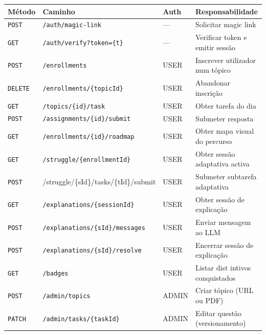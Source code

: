 \begin{table}[htbp]
	\centering
	\small
	\begin{tabular}{p{1.5cm} p{6.0cm} p{1.3cm} p{3.8cm}}
		\toprule
		\textbf{M\'etodo} & \textbf{Caminho} & \textbf{Auth} & \textbf{Responsabilidade} \\
		\midrule
		\texttt{POST}  & \texttt{/auth/magic-link}                        & ---   & Solicitar magic link \\
		\texttt{GET}   & \texttt{/auth/verify?token=\{t\}}                & ---   & Verificar token e emitir sess\~ao \\
		\texttt{POST}  & \texttt{/enrollments}                            & USER  & Inscrever utilizador num t\'opico \\
		\texttt{DELETE}& \texttt{/enrollments/\{topicId\}}                & USER  & Abandonar inscri\c{c}\~ao \\
		\texttt{GET}   & \texttt{/topics/\{id\}/task}                     & USER  & Obter tarefa do dia \\
		\texttt{POST}  & \texttt{/assignments/\{id\}/submit}              & USER  & Submeter resposta \\
		\texttt{GET}   & \texttt{/enrollments/\{id\}/roadmap}             & USER  & Obter mapa visual do percurso \\
		\texttt{GET}   & \texttt{/struggle/\{enrollmentId\}}              & USER  & Obter sess\~ao adaptativa activa \\
		\texttt{POST}  & {\ttfamily /struggle/\allowbreak\{sId\}/\allowbreak tasks/\allowbreak\{tId\}/\allowbreak submit} & USER  & Submeter subtarefa adaptativa \\
		\texttt{GET}   & \texttt{/explanations/\{sessionId\}}             & USER  & Obter sess\~ao de explica\c{c}\~ao \\
		\texttt{POST}  & \texttt{/explanations/\{sId\}/messages}          & USER  & Enviar mensagem ao LLM \\
		\texttt{POST}  & \texttt{/explanations/\{sId\}/resolve}           & USER  & Encerrar sess\~ao de explica\c{c}\~ao \\
		\texttt{GET}   & \texttt{/badges}                                 & USER  & Listar dist intivos conquistados \\
		\texttt{POST}  & \texttt{/admin/topics}                           & ADMIN & Criar t\'opico (URL ou PDF) \\
		\texttt{PATCH} & \texttt{/admin/tasks/\{taskId\}}                 & ADMIN & Editar quest\~ao (versionamento) \\

\end{tabular}
\end{table}
